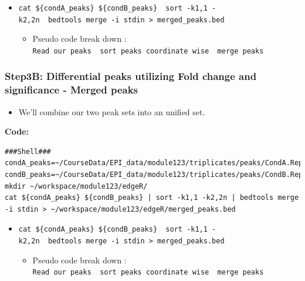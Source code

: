 \documentclass[
]{book}
\providecommand{\tightlist}{%
  \setlength{\itemsep}{0pt}\setlength{\parskip}{0pt}}
\begin{document}
\begin{itemize}
\tightlist
\item
  \texttt{cat\ \$\{condA\_peaks\}\ \$\{condB\_peaks\}\ \textbar{}\ sort\ -k1,1\ -k2,2n\ \textbar{}\ bedtools\ merge\ -i\ stdin\ \textgreater{}\ merged\_peaks.bed}

  \begin{itemize}
  \tightlist
  \item
    Pseudo code break down : \texttt{Read\ our\ peaks\ \textbar{}\ sort\ peaks\ coordinate\ wise\ \textbar{}\ merge\ peaks}
  \end{itemize}
\end{itemize}

\subsubsection{Step3B: Differential peaks utilizing Fold change and significance - Merged peaks}\label{step3b-differential-peaks-utilizing-fold-change-and-significance---merged-peaks}

\begin{itemize}
\tightlist
\item
  We'll combine our two peak sets into an unified set.
\end{itemize}

\textbf{Code:}

\begin{verbatim}
###Shell###
condA_peaks=~/CourseData/EPI_data/module123/triplicates/peaks/CondA.Rep1_peaks.narrowPeak
condB_peaks=~/CourseData/EPI_data/module123/triplicates/peaks/CondB.Rep1_peaks.narrowPeak
mkdir ~/workspace/module123/edgeR/
cat ${condA_peaks} ${condB_peaks} | sort -k1,1 -k2,2n | bedtools merge -i stdin > ~/workspace/module123/edgeR/merged_peaks.bed
\end{verbatim}

\begin{itemize}
\tightlist
\item
  \texttt{cat\ \$\{condA\_peaks\}\ \$\{condB\_peaks\}\ \textbar{}\ sort\ -k1,1\ -k2,2n\ \textbar{}\ bedtools\ merge\ -i\ stdin\ \textgreater{}\ merged\_peaks.bed}

  \begin{itemize}
  \tightlist
  \item
    Pseudo code break down : \texttt{Read\ our\ peaks\ \textbar{}\ sort\ peaks\ coordinate\ wise\ \textbar{}\ merge\ peaks}
  \end{itemize}
\end{itemize}
\end{document}

